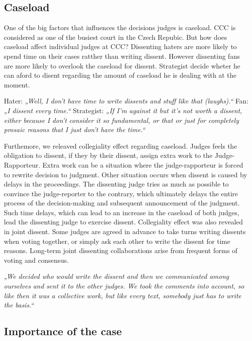 \documentclass[
  11pt,
]{article}
\begin{document}
\hypertarget{caseload}{%
\subsection{Caseload}\label{caseload}}

One of the big factors that influences the decisions judges is caseload.
CCC is considered as one of the busiest court in the Czech Repubic. But
how does caseload affect individual judges at CCC? Dissenting haters are
more likely to spend time on their cases ratther than writing dissent.
However dissenting fans are more likely to overlook the caseload for
dissent. Strategist decide wheter he can aford to disent regarding the
amount of caseload he is dealing with at the moment.

Hater: \emph{„Well, I don't have time to write dissents and stuff like
that (laughs).``} Fan: \emph{„I dissent every time.``} Strategist:
\emph{„If I'm against it but it's not worth a dissent, either because I
don't consider it so fundamental, or that or just for completely prosaic
reasons that I just don't have the time.``}

Furthemore, we releaved collegiality effect regarding caseload. Judges
feels the obligation to dissent, if they by their dissent, assign extra
work to the Judge-Rapporteur. Extra work can be a situation where the
judge-rapporteur is forced to rewrite decision to judgment. Other
situation occurs when dissent is caused by delays in the proceedings.
The dissenting judge tries as much as possible to convince the
judge-reporter to the contrary, which ultimately delays the entire
process of the decision-making and subsequent announcement of the
judgment. Such time delays, which can lead to an increase in the
caseload of both judges, lead the dissenting judge to exercise dissent.
Collegiality effect was also revealed in joint dissent. Some judges are
agreed in advance to take turns writing dissents when voting together,
or simply ask each other to write the dissent for time reasons.
Long-term joint dissenting collaborations arise from frequent forms of
voting and consensus.

\emph{„We decided who would write the dissent and then we communicated
among ourselves and sent it to the other judges. We took the comments
into account, so like then it was a collective work, but like every
text, somebody just has to write the basis.``}

\hypertarget{importance-of-the-case}{%
\subsection{Importance of the case}\label{importance-of-the-case}}
\end{document}
